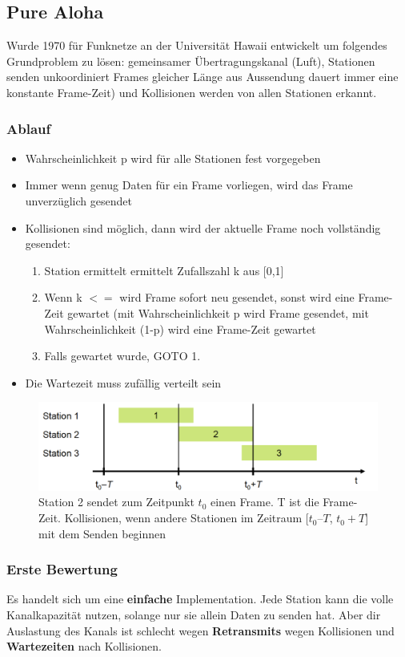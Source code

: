 \documentclass{article} %
\begin{document}
\subsection{Pure Aloha}
Wurde 1970 für  Funknetze an der Universität Hawaii entwickelt  um folgendes Grundproblem zu lösen: gemeinsamer Übertragungskanal (Luft), Stationen senden unkoordiniert Frames gleicher Länge aus Aussendung dauert immer eine konstante Frame-Zeit) und Kollisionen werden von allen Stationen erkannt.
\subsubsection{Ablauf}
	\begin{itemize}
	\item Wahrscheinlichkeit p wird für alle Stationen fest vorgegeben 
	\item Immer wenn genug Daten für ein Frame vorliegen, wird das Frame unverzüglich gesendet 
	\item Kollisionen sind möglich, dann wird der aktuelle Frame noch vollständig gesendet:
		\begin{enumerate}
		\item Station ermittelt ermittelt Zufallszahl k aus [0,1]
		\item Wenn k $<=$ wird Frame sofort neu gesendet, sonst wird eine Frame-Zeit gewartet (mit Wahrscheinlichkeit p wird Frame gesendet, mit Wahrscheinlichkeit (1-p) wird eine Frame-Zeit gewartet 
		\item Falls gewartet wurde, GOTO 1. 
		\end{enumerate}
	\item Die Wartezeit muss zufällig verteilt sein 
	\end{itemize}	

\begin{figure}[ht]
	\centering
  \includegraphics[width=12cm]{img/pure1.png}
	\caption{Station 2 sendet zum Zeitpunkt $t_0$  einen Frame. T ist die Frame-Zeit. Kollisionen, wenn andere Stationen im Zeitraum [$t_0–T$, $t_0+T$] mit dem Senden beginnen}
\end{figure}

\subsubsection{Erste Bewertung}
Es handelt sich um eine \textbf{einfache} Implementation. Jede Station kann die volle Kanalkapazität nutzen, solange nur sie allein Daten zu senden hat. Aber dir Auslastung des Kanals ist schlecht wegen \textbf{Retransmits} wegen Kollisionen und \textbf{Wartezeiten} nach Kollisionen.
\end{document}
